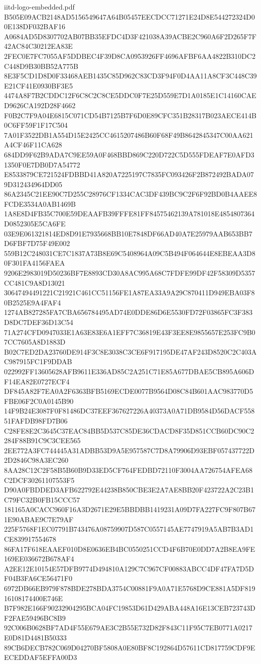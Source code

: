 \begin{filecontents*}[overwrite]{iitd-logo-embedded.pdf}
B505E09ACB2148AD5156549647A64B05457EECDCC71271E24D8E544272324D00E138DF032BAF16
A0684AD5D8307702AB07BB35EFDC4D3F421038A39ACBE2C960A6F2D265F7F42AC84C30212EA83E
2FEC0E7FC7055AF5DDBEC4F39D8CA0953926FF4696AFBF6AA4822B310DC2C448D9B30BB52A775B
8E3F5CD1D8D0F33468AEB1435C85D962C83CD3F94F0D4AA11A8CF3C448C39E21CF41E0930BF3E5
4474A8F7B2CDDC12F6C8C2C8CE5DDC0F7E25D559E7D1A0185E1C14160CAED9626CA192D28F4662
F0B2C7F9A04E6815C071CD54B7125B7F6D0E89CFC351B28317B023AECE414B0C6FF59F1F17C504
7A01F3522DB1A554D15E2425CC4615207486B60F68F49B8642845347C00AA621A4CF46F11CA628
684DD9F62B9ADA7C9EE59A0F468BBD869C220D722C5D555FDEAF7E0AFD31350F0E7DB0D7A54772
E8533879CE721524FDBBD41A820A7225197C7835FC093426F2B872492BADA079D312434964DD05
86A2345C21EE90C7D255C28976CF1334CAC3DF439BC9C2F6F92BD0B4AAEE8FCDE3534A0AB1469B
1A8E8D4FB35C700E59DEAAFB39FFFE81FF84575462139A781018E4854807364D0852305E5CA6FE
03E9E061321814ED8D91E7935668BB10E7848DF66AD40A7E25979AAB653BB7D6FBF7D75F49E002
559B12C248031CE7C1837A73B8E69C5408964A09C5B494F064644E8EBEAA3D80F301FA4156FAEA
9206E2983019D50236BF7E8893CD30A8AC995A68C7FDFE99DF42F58309D5357CC481C9A8D13021
30647494491221C21921C461CC51156FE1A87EA33A9A29C870411D949EBA03F80B2525E9A4FAF4
1274AB827285FA7CBA656784495AD74E0DDE86D6E5530FD72F03865FC3F383D8DC7DEF36D13C54
71A274CFD0947033E1A63E83E6A1EFF7C36819E43F3EE8E9855657E253FC9B07CC7605A8D1883D
B02C7ED2DA23760DE914F3C8E3038C3CE6F917195DE47AF243D8520C2C403AC987915FC1F9DDAB
022992FF13605628AFB9611E336AD85C2A251C71E85A677DBAE5CB895A606DF14EA82E0727ECF4
DF845A82F7EA0A2F6363BFB5169ECDE0077B9564D08C84B601AAC983770D5FBE06F2C0A0145B90
14F9B24E3087F0F81486DC37EEF367627226A40373A0A71DB9584D56DACF55851FAFDB98FD7B06
C28FE8E2C3645C37EAC84BB5D537C85DE36CDACD8F35D851CCB60DC90C2284F88B91C9C3CEE565
2EE772A3FC744445A31ADBB53D9A5E957587C7D8A79906D93EBF057437722D2D2846C98A3EC260
8AA28C12C2F58B5B60B9D33ED5CF764FEDBD72110F3004AA726754AFEA68C2DCF30261107553F5
D90A0FBDDED3AFB622792E44238B850CBE3E2A7AE8BB20F423722A2C23B1C79FC32B0FB15CCC57
181165A0CACC960F16A3D2671E29E5BBDBB1419231A09D7FA227FC9F807B671E90ABAE9C7E79AF
225F5768F1EC07791B743476A08759907D587C0557145AE7747919A5AB7B3AD1CE839917554678
86FA17F618EAAEF010D8E0636EB4BC0550251CCD4F6B70E0DD7A2B8EA9FE169EE036672B678AF4
A2EE12E10154E57DFB9774D494810A129C7C967CF00883ABCC4DF47FA7D5DF04B3FA6CE56471F0
6972DB66EB979F878BDE278BDA3754C00881F9A0A71E5768D9CE881A5DF81916108174400E746E
B7F982E166F90232904295BCA04FC19853D61D429ABA448A16E13CEB723743DF2FAE59496BC8B9
92C006B0628BF7AD4F55E679AE3C2B55E732D82F843C11F95C7EB0771A0217E0D81D4481B50333
89CB6DECB782C069D04270BF5808A0E80BF8C192864D57611CD817759CDF9EECEDDAF5EFFA00D3

\end{filecontents*}

